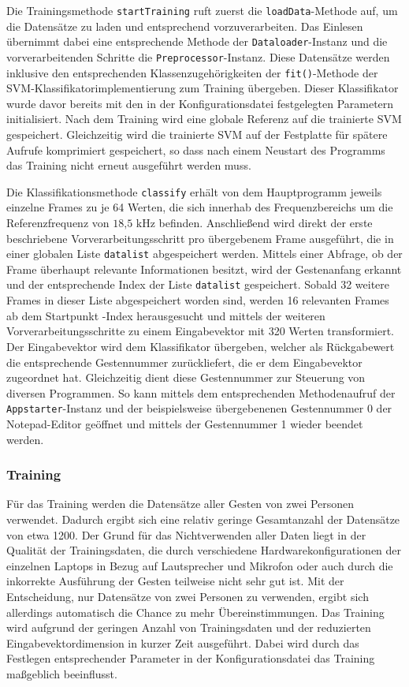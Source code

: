 Die Trainingsmethode \texttt{startTraining} ruft zuerst die \texttt{loadData}-Methode auf, um die Datensätze zu laden und entsprechend vorzuverarbeiten.
Das Einlesen übernimmt dabei eine entsprechende Methode der \texttt{Dataloader}-Instanz und die vorverarbeitenden Schritte die \texttt{Preprocessor}-Instanz.
Diese Datensätze werden inklusive den entsprechenden Klassenzugehörigkeiten der \texttt{fit()}-Methode der \ac{SVM}-Klassifikatorimplementierung zum Training übergeben.
Dieser Klassifikator wurde davor bereits mit den in der Konfigurationsdatei festgelegten Parametern initialisiert.
Nach dem Training wird eine globale Referenz auf die trainierte \ac{SVM} gespeichert.
Gleichzeitig wird die trainierte \ac{SVM} auf der Festplatte für spätere Aufrufe komprimiert gespeichert, so dass nach einem Neustart des Programms das Training nicht erneut ausgeführt werden muss.

Die Klassifikationsmethode \texttt{classify} erhält von dem Hauptprogramm jeweils einzelne Frames zu je 64 Werten, die sich innerhab des Frequenzbereichs um die Referenzfrequenz von $18\text{,}5\text{ kHz}$ befinden.
Anschließend wird direkt der erste beschriebene Vorverarbeitungsschritt pro übergebenem Frame ausgeführt, die in einer globalen Liste \texttt{datalist} abgespeichert werden.
Mittels einer Abfrage, ob der Frame überhaupt relevante Informationen besitzt, wird der Gestenanfang erkannt und der entsprechende Index der Liste \texttt{datalist} gespeichert.
Sobald 32 weitere Frames in dieser Liste abgespeichert worden sind, werden 16 relevanten Frames ab dem Startpunkt -Index herausgesucht und mittels der weiteren Vorverarbeitungsschritte zu einem Eingabevektor mit 320 Werten transformiert.
Der Eingabevektor wird dem Klassifikator übergeben, welcher als Rückgabewert die entsprechende Gestennummer zurückliefert, die er dem Eingabevektor zugeordnet hat.
Gleichzeitig dient diese Gestennummer zur Steuerung von diversen Programmen.
So kann mittels dem entsprechenden Methodenaufruf der \texttt{Appstarter}-Instanz und der beispielsweise übergebenenen Gestennummer 0 der Notepad-Editor geöffnet und mittels der Gestennummer 1 wieder beendet werden.
\subsubsection{Training}\label{sec:svm_training}
Für das Training werden die Datensätze aller Gesten von zwei Personen verwendet.
Dadurch ergibt sich eine relativ geringe Gesamtanzahl der Datensätze von etwa 1200.
Der Grund für das Nichtverwenden aller Daten liegt in der Qualität der Trainingsdaten, die durch verschiedene Hardwarekonfigurationen der einzelnen Laptops in Bezug auf Lautsprecher und Mikrofon oder auch durch die inkorrekte Ausführung der Gesten teilweise nicht sehr gut ist.
Mit der Entscheidung, nur Datensätze von zwei Personen zu verwenden, ergibt sich allerdings automatisch die Chance zu mehr Übereinstimmungen.
Das Training wird aufgrund der geringen Anzahl von Trainingsdaten und der reduzierten Eingabevektordimension in kurzer Zeit ausgeführt.
Dabei wird durch das Festlegen entsprechender Parameter in der Konfigurationsdatei das Training maßgeblich beeinflusst. 

